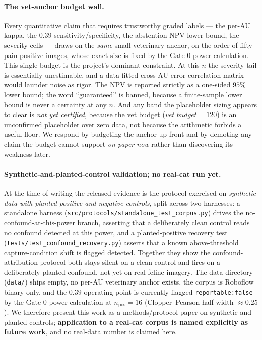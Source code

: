 \paragraph{The vet-anchor budget wall.}
Every quantitative claim that requires trustworthy graded labels --- the per-AU
kappa, the $0.39$ sensitivity/specificity, the abstention NPV lower bound, the
severity cells --- draws on the \emph{same} small veterinary anchor, on the
order of fifty pain-positive images, whose exact size is fixed by the Gate-0
power calculation. This single budget is the project's dominant constraint. At
this $n$ the severity tail is essentially unestimable, and a data-fitted cross-AU
error-correlation matrix would launder noise as rigor. The NPV is reported
strictly as a one-sided $95\%$ lower bound; the word ``guaranteed'' is banned,
because a finite-sample lower bound is never a certainty at any $n$. And any band
the placeholder sizing appears to clear is \emph{not yet certified}, because the
vet budget ($\mathit{vet\_budget}{=}120$) is an unconfirmed placeholder over zero
data, not because the arithmetic forbids a useful floor. We respond by budgeting
the anchor up front and by demoting any claim the budget cannot support
\emph{on paper now} rather than discovering its weakness later.

\paragraph{Synthetic-and-planted-control validation; no real-cat run yet.}
At the time of writing the released evidence is the protocol exercised on
\emph{synthetic data with planted positive and negative controls}, split across
two harnesses: a standalone harness
(\texttt{src/protocols/standalone\_test\_corpus.py}) drives the
no-confound-at-this-power branch, asserting that a deliberately clean control
reads no confound detected at this power, and a planted-positive recovery test
(\texttt{tests/test\_confound\_recovery.py}) asserts that a known
above-threshold capture-condition shift is flagged detected. Together they show
the confound-attribution protocol both stays silent on a clean control and fires
on a deliberately planted confound, not yet on real feline imagery. The
data directory (\texttt{data/}) ships empty, no per-AU veterinary anchor exists, the
corpus is Roboflow binary-only, and the $0.39$ operating point is currently
flagged \texttt{reportable:false} by the Gate-0 power calculation at
$n_{\text{pos}}{=}16$ (Clopper--Pearson half-width $\approx 0.25$). We therefore present this work as a
methods/protocol paper on synthetic and planted controls; \textbf{application to a
real-cat corpus is named explicitly as future work}, and no real-data number is
claimed here.

